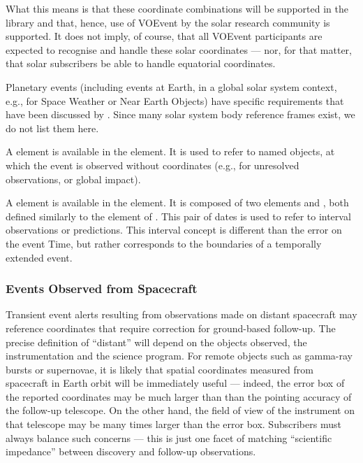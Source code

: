\documentclass[11pt,a4paper]{ivoa}
\begin{document}
What this means is that these coordinate combinations will be supported in the
library and that, hence, use of VOEvent by the solar research community is
supported. It does not imply, of course, that all VOEvent participants are
expected to recognise and handle these solar coordinates --- nor, for that
matter, that solar subscribers be able to handle equatorial coordinates.

Planetary events (including events at Earth, in a global solar system context,
e.g., for Space Weather or Near Earth Objects) have specific requirements that
have been discussed by \citet{2018arXiv181112680C}. Since many solar system body
reference frames exist, we do not list them here.

A  element is available in the
 element. It is used to refer to named objects,
at which the event is observed without coordinates (e.g., for unresolved
observations, or global impact).

A  element is available in the
 element. It is composed of two elements
 and , both defined similarly to
the  element of . This pair of dates is used to refer to
interval observations or predictions. This interval concept is different than
the error on the event Time, but rather corresponds to the boundaries of a
temporally extended event.

\subsubsection{Events Observed from Spacecraft}
\label{sec:3.4.5}
Transient event alerts resulting from observations made on distant spacecraft
may reference coordinates that require correction for ground-based follow-up.
The precise definition of ``distant'' will depend on the objects observed, the
instrumentation and the science program. For remote objects such as gamma-ray
bursts or supernovae, it is likely that spatial coordinates measured from
spacecraft in Earth orbit will be immediately useful --- indeed, the error box
of the reported coordinates may be much larger than than the pointing accuracy
of the follow-up telescope. On the other hand, the field of view of the
instrument on that telescope may be many times larger than the error box.
Subscribers must always balance such concerns --- this is just one facet of
matching ``scientific impedance'' between discovery and follow-up observations.
\end{document}
